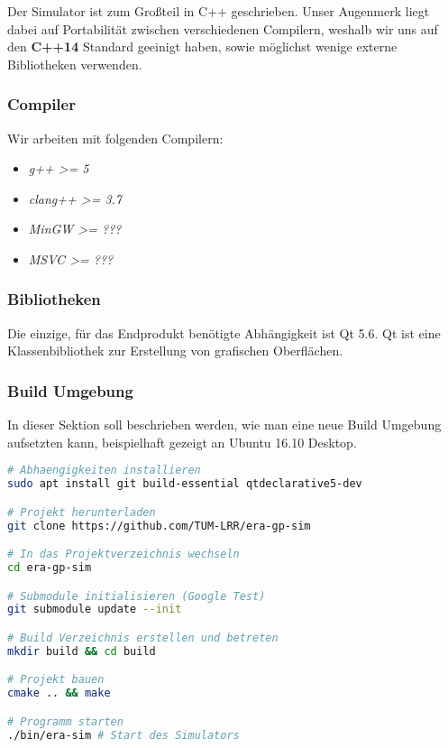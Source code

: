 Der Simulator ist zum Großteil in C++ geschrieben. Unser Augenmerk liegt dabei auf Portabilität
zwischen verschiedenen Compilern, weshalb wir uns auf den \textbf{C++14} Standard geeinigt haben,
sowie möglichst wenige externe Bibliotheken verwenden.

\subsubsection{Compiler}

Wir arbeiten mit folgenden Compilern:

\begin{itemize}
	\item \textit{g++ >= 5}
	\item \textit{clang++ >= 3.7}
	\item \textit{MinGW >= ???}
	\item \textit{MSVC >= ???}
\end{itemize}

\subsubsection{Bibliotheken}

Die einzige, für das Endprodukt benötigte Abhängigkeit ist Qt 5.6. Qt ist eine
Klassenbibliothek zur Erstellung von grafischen Oberflächen.


\subsubsection{Build Umgebung}

In dieser Sektion soll beschrieben werden, wie man eine neue Build Umgebung aufsetzten kann,
beispielhaft gezeigt an Ubuntu 16.10 Desktop.


\begin{lstlisting}[language=bash]
# Abhaengigkeiten installieren
sudo apt install git build-essential qtdeclarative5-dev

# Projekt herunterladen
git clone https://github.com/TUM-LRR/era-gp-sim

# In das Projektverzeichnis wechseln
cd era-gp-sim

# Submodule initialisieren (Google Test)
git submodule update --init

# Build Verzeichnis erstellen und betreten
mkdir build && cd build

# Projekt bauen
cmake .. && make

# Programm starten
./bin/era-sim # Start des Simulators
\end{lstlisting}

